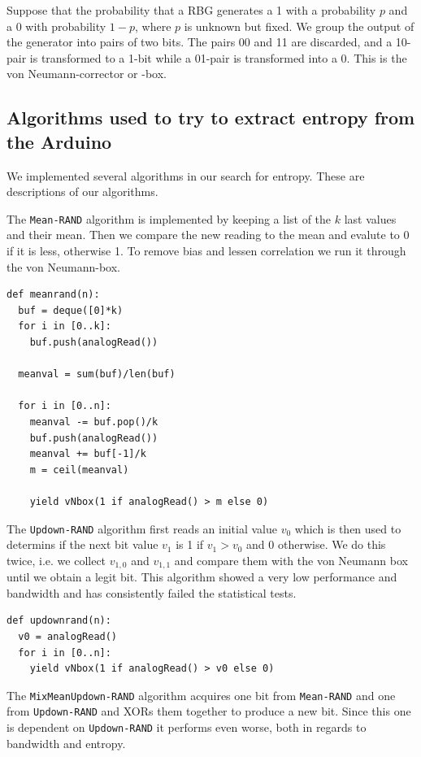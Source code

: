 \documentclass[a4paper]{article}           %
\begin{document}
Suppose that the probability that a RBG generates a 1 with a probability $p$ and a 0 with probability $1-p$, where $p$ is unknown but fixed. We group the output of the generator into pairs of two bits. The pairs 00 and 11 are discarded, and a 10-pair is transformed to a 1-bit while a 01-pair is transformed into a 0. This is the von Neumann-corrector\cite{menezes1996, intel} or -box. 

\subsection{Algorithms used to try to extract entropy from the Arduino}

We implemented several algorithms in our search for entropy. These are descriptions of our algorithms. 

The \texttt{Mean-RAND} algorithm is implemented by keeping a list of the $k$ last values and their mean. Then we compare the new reading to the mean and evalute to 0 if it is less, otherwise 1. To remove bias and lessen correlation we run it through the von Neumann-box. 

\begin{lstlisting}[caption=The \texttt{Mean-RAND} algorithm in Python-ish pseudocode]
def meanrand(n):
  buf = deque([0]*k)
  for i in [0..k]:
    buf.push(analogRead())

  meanval = sum(buf)/len(buf)

  for i in [0..n]:
    meanval -= buf.pop()/k
    buf.push(analogRead())
    meanval += buf[-1]/k
    m = ceil(meanval)

    yield vNbox(1 if analogRead() > m else 0)
  \end{lstlisting}

The \texttt{Updown-RAND} algorithm first reads an initial value $v_0$ which is then used to determins if the next bit value $v_1$ is 1 if $v_1 > v_0$ and 0 otherwise. We do this twice, i.e. we collect $v_{1,0}$ and $v_{1,1}$ and compare them with the von Neumann box until we obtain a legit bit. This algorithm showed a very low performance and bandwidth and has consistently failed the statistical tests. 

\begin{lstlisting}[caption=The \texttt{Updown-RAND} algorithm]
def updownrand(n):
  v0 = analogRead()
  for i in [0..n]:
    yield vNbox(1 if analogRead() > v0 else 0)
\end{lstlisting}

The \texttt{MixMeanUpdown-RAND} algorithm acquires one bit from \texttt{Mean-RAND} and one from \texttt{Updown-RAND} and XORs them together to produce a new bit. Since this one is dependent on \texttt{Updown-RAND} it performs even worse, both in regards to bandwidth and entropy. 
\end{document}
